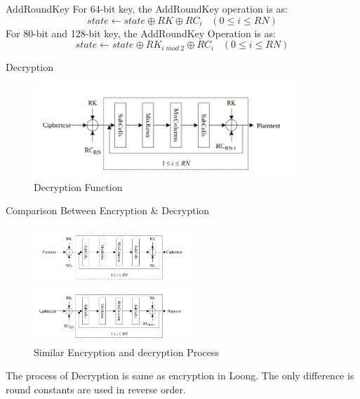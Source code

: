 \begin{frame}{AddRoundKey}
    For 64-bit key, the AddRoundKey operation is as:
    \begin{equation}
        state \leftarrow state \oplus RK \oplus RC_{i} \hspace{10pt}
        (0 \leq i \leq RN)     
    \end{equation}
    For 80-bit and 128-bit key, the AddRoundKey Operation is as:\\
    \begin{equation}
        state \leftarrow state \oplus RK_{i\;mod\;2} \oplus RC_{i}
        \hspace{10pt}
        (0 \leq i \leq RN) 
    \end{equation}
\end{frame}

\begin{frame}{Decryption}
    \begin{figure}[htp]
    \centering
    \includegraphics[width=10cm]{decrypt.png}
    \caption{Decryption Function}
    \label{fig:encryption-function}
\end{figure}
\end{frame}

\begin{frame}{Comparison Between Encryption \& Decryption}
    \begin{figure}[ht]
        \begin{minipage}[b]{0.45\linewidth}
            \centering
            \includegraphics[width=6cm]{encrypt.png}
            \caption{Encryption Process}
            \label{fig:a}
        \end{minipage}
        \hspace{0.5cm}
        \begin{minipage}[b]{0.45\linewidth}
            \centering
            \includegraphics[width=6cm]{decrypt.png}
            \caption{Decryption Process}
            \label{fig:b}
        \end{minipage}
        \caption{Similar Encryption and decryption Process}
    \end{figure}
    The process of Decryption is same as encryption in Loong. The only difference is round constants are used in reverse order.
\end{frame}

